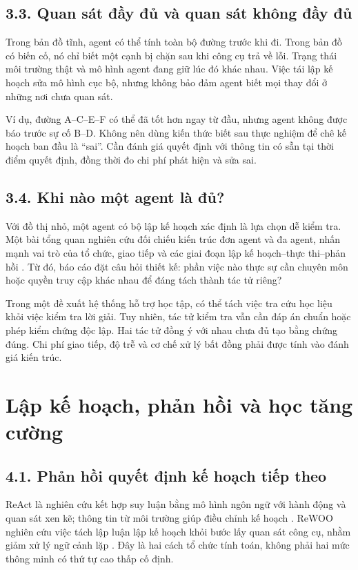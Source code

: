 \documentclass[11pt,a4paper]{article}
\begin{document}
\subsection{3.3. Quan sát đầy đủ và quan sát không đầy đủ}
Trong bản đồ tĩnh, agent có thể tính toàn bộ đường trước khi đi. Trong bản đồ có biến
cố, nó chỉ biết một cạnh bị chặn sau khi công cụ trả về lỗi. Trạng thái môi trường thật
và mô hình agent đang giữ lúc đó khác nhau. Việc tái lập kế hoạch sửa mô hình cục bộ,
nhưng không bảo đảm agent biết mọi thay đổi ở những nơi chưa quan sát.

Ví dụ, đường A--C--E--F có thể đã tốt hơn ngay từ đầu, nhưng agent không được báo trước
sự cố B--D. Không nên dùng kiến thức biết sau thực nghiệm để chê kế hoạch ban đầu là
``sai''. Cần đánh giá quyết định với thông tin có sẵn tại thời điểm quyết định, đồng thời
đo chi phí phát hiện và sửa sai.

\subsection{3.4. Khi nào một agent là đủ?}
Với đồ thị nhỏ, một agent có bộ lập kế hoạch xác định là lựa chọn dễ kiểm tra.
Một bài tổng quan nghiên cứu đối chiếu kiến trúc đơn agent và đa agent, nhấn mạnh vai trò
của tổ chức, giao tiếp và các giai đoạn lập kế hoạch--thực thi--phản hồi \cite{survey}.
Từ đó, báo cáo đặt câu hỏi thiết kế: phần việc nào thực sự cần chuyên môn hoặc quyền
truy cập khác nhau để đáng tách thành tác tử riêng?

Trong một đề xuất hệ thống hỗ trợ học tập, có thể tách việc tra cứu học liệu khỏi việc
kiểm tra lời giải. Tuy nhiên, tác tử kiểm tra vẫn cần đáp án chuẩn hoặc phép kiểm chứng
độc lập. Hai tác tử đồng ý với nhau chưa đủ tạo bằng chứng đúng. Chi phí giao tiếp,
độ trễ và cơ chế xử lý bất đồng phải được tính vào đánh giá kiến trúc.

\newpage
\section{Lập kế hoạch, phản hồi và học tăng cường}
\subsection{4.1. Phản hồi quyết định kế hoạch tiếp theo}
ReAct là nghiên cứu kết hợp suy luận bằng mô hình ngôn ngữ với hành động và quan sát
xen kẽ; thông tin từ môi trường giúp điều chỉnh kế hoạch \cite{react}. ReWOO nghiên cứu
việc tách lập luận lập kế hoạch khỏi bước lấy quan sát công cụ, nhằm giảm xử lý ngữ cảnh
lặp \cite{rewoo}. Đây là hai cách tổ chức tính toán, không phải hai mức thông minh
có thứ tự cao thấp cố định.
\end{document}
